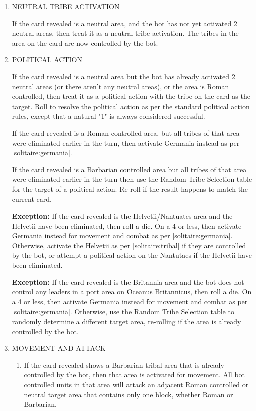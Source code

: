 \renewcommand{\labelenumii}{\alph{enumii}.}
\begin{enumerate}
  \item NEUTRAL TRIBE ACTIVATION

  If the card revealed is a neutral area, and the bot has not yet activated 2 neutral areas, then treat it as a neutral tribe activation. The tribes in the area on the card are now controlled by the bot.

  \item POLITICAL ACTION
  
  If the card revealed is a neutral area but the bot has already activated 2 neutral areas (or there aren't any neutral areas), or the area is Roman controlled, then treat it as a political action with the tribe on the card as the target. Roll to resolve the political action as per the standard political action rules, except that a natural "1" is always considered successful.
  
  If the card revealed is a Roman controlled area, but all tribes of that area were eliminated earlier in the turn, then activate Germania instead as per \ref{solitaire:germania}.
  
  If the card revealed is a Barbarian controlled area but all tribes of that area were eliminated earlier in the turn then use the Random Tribe Selection table for the target of a political action. Re-roll if the result happens to match the current card.
  
  \textbf{Exception:} If the card revealed is the Helvetii/Nantuates area and the Helvetii have been eliminated, then roll a die. On a 4 or less, then activate Germania instead for movement and combat as per \ref{solitaire:germania}. Otherwise, activate the Helvetii as per \ref{solitaire:tribal} if they are controlled by the bot, or attempt a political action on the Nantutaes if the Helvetii have been eliminated.
  
  \textbf{Exception:} If the card revealed is the Britannia area and the bot does not control any leaders in a port area on Oceanus Britannicus, then roll a die. On a 4 or less, then activate Germania instead for movement and combat as per \ref{solitaire:germania}. Otherwise, use the Random Tribe Selection table to randomly determine a different target area, re-rolling if the area is already controlled by the bot.

  \item MOVEMENT AND ATTACK

  \begin{enumerate}[leftmargin=0in]
    \item \label{solitaire:tribal} If the card revealed shows a Barbarian tribal area that is already controlled by the bot, then that area is activated for movement. All bot controlled units in that area will attack an adjacent Roman controlled or neutral target area that contains only one block, whether Roman or Barbarian.
    

\end{enumerate}
\end{enumerate}

